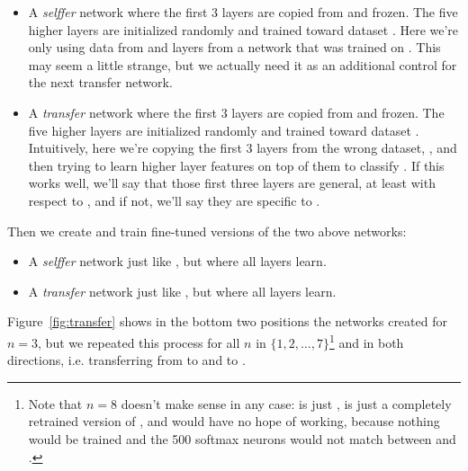 \begin{itemize}
\item A \emph{selffer} network  where the first $3$ layers are copied from  and frozen. The five higher layers are initialized randomly and trained toward dataset \dB. Here we're only using data from \dB and layers from a network  that was trained on \dB. This may seem a little strange, but we actually need it as an additional control for the next transfer network.

\item A \emph{transfer} network  where the first $3$ layers are copied from  and frozen. The five higher layers are initialized randomly and trained toward dataset \dB. Intuitively, here we're copying the first $3$ layers from the wrong dataset, \dA,  and then trying to learn higher layer features on top of them to classify \dB. If this works well, we'll say that those first three layers are general, at least with respect to \dB, and if not, we'll say they are specific to \dA.
\end{itemize}

Then we create and train fine-tuned versions of the two above networks:

\begin{itemize}
\item A \emph{selffer} network  just like , but where all layers learn.
\item A \emph{transfer} network  just like , but where all layers learn.
\end{itemize}

Figure~\ref{fig:transfer} shows in the bottom two positions the networks created for $n = 3$, but we repeated this process for all $n$ in $\{1, 2, \ldots, 7\}$\footnote{Note that $n=8$ doesn't make sense in any case:  is just ,  is just a completely retrained version of , and  would have no hope of working, because nothing would be trained and the 500 softmax neurons would not match between \dA and \dB.} and in both directions, i.e. transferring from \dA to \dB and \dB to \dA.


